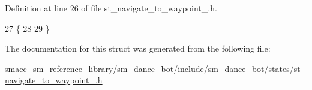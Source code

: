 Definition at line 26 of file st\+\_\+navigate\+\_\+to\+\_\+waypoint\+\_.\+h.


\begin{DoxyCode}
27   \{
28     
29   \}
\end{DoxyCode}


The documentation for this struct was generated from the following file\+:\begin{DoxyCompactItemize}
\item 
smacc\+\_\+sm\+\_\+reference\+\_\+library/sm\+\_\+dance\+\_\+bot/include/sm\+\_\+dance\+\_\+bot/states/\hyperlink{st__navigate__to__waypoint__1_8h}{st\+\_\+navigate\+\_\+to\+\_\+waypoint\+\_.\+h}\end{DoxyCompactItemize}
